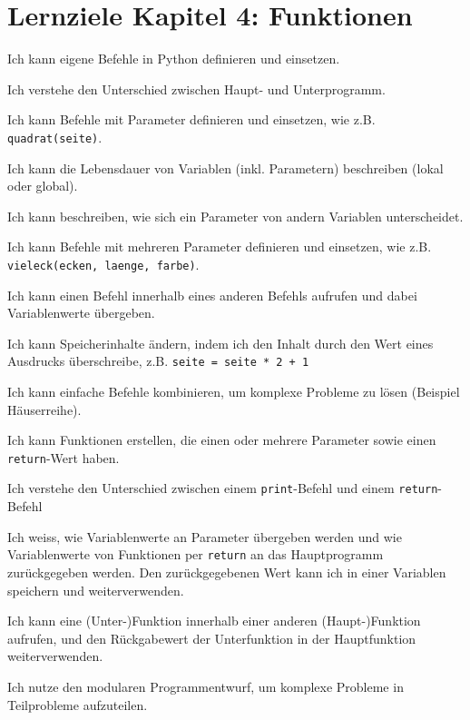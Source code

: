\section*{Lernziele Kapitel 4: Funktionen}
\begin{todolist}
    \item Ich kann eigene Befehle in Python definieren und einsetzen.
    \item Ich verstehe den Unterschied zwischen Haupt- und Unterprogramm.
    \item Ich kann Befehle mit Parameter definieren und einsetzen, wie z.B. \lstinline|quadrat(seite)|.
    \item Ich kann die Lebensdauer von Variablen (inkl. Parametern) beschreiben (lokal oder global).
    \item Ich kann beschreiben, wie sich ein Parameter von andern Variablen unterscheidet.
    \item Ich kann Befehle mit mehreren Parameter definieren und einsetzen, wie z.B. \lstinline|vieleck(ecken, laenge, farbe)|.
    \item Ich kann einen Befehl innerhalb eines anderen Befehls aufrufen und dabei Variablenwerte übergeben.
    \item Ich kann Speicherinhalte ändern, indem ich den Inhalt durch den Wert eines Ausdrucks überschreibe, z.B. \lstinline|seite = seite * 2 + 1|
    \item Ich kann einfache Befehle kombinieren, um komplexe Probleme zu lösen (Beispiel Häuserreihe).
    \item Ich kann Funktionen erstellen, die einen oder mehrere Parameter sowie einen \lstinline|return|-Wert haben.
    \item Ich verstehe den Unterschied zwischen einem \lstinline|print|-Befehl und einem \lstinline|return|-Befehl
    \item Ich weiss, wie Variablenwerte an Parameter übergeben werden und wie Variablenwerte von Funktionen per \lstinline|return| an das Hauptprogramm zurückgegeben werden. Den zurückgegebenen Wert kann ich in einer Variablen speichern und weiterverwenden.
    \item Ich kann eine (Unter-)Funktion innerhalb einer anderen (Haupt-)Funktion aufrufen, und den Rückgabewert der Unterfunktion in der Hauptfunktion weiterverwenden.
    \item Ich nutze den modularen Programmentwurf, um komplexe Probleme in Teilprobleme aufzuteilen.
\end{todolist}

